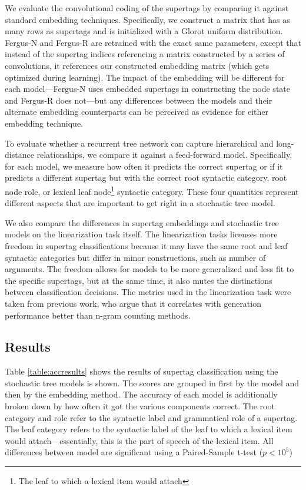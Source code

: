\documentclass[11pt]{article}
\begin{document}
We evaluate the convolutional coding of the supertags by comparing it against standard embedding techniques.
%
Specifically, we construct a matrix that has as many rows as supertags and is initialized with a Glorot uniform distribution.
%
Fergus-N and Fergus-R are retrained with the exact same parameters, except that instead of the supertag indices referencing a matrix constructed by a series of convolutions, it references our constructed embedding matrix (which gets optimized during learning). 
%
The impact of the embedding will be different for each model---Fergus-N uses embedded supertags in constructing the node state and Fergus-R does not---but any differences between the models and their alternate embedding counterparts can be perceived as evidence for either embedding technique.  


To evaluate whether a recurrent tree network can capture hierarchical and long-distance relationships, we compare it against a feed-forward model. 
%
Specifically, for each model, we measure how often it predicts the correct supertag or if it predicts a different supertag but with the correct root syntactic category, root node role, or lexical leaf node\footnote{The leaf to which a lexical item would attach} syntactic category.
%
These four quantities represent different aspects that are important to get right in a stochastic tree model.



We also compare the differences in supertag embeddings and stochastic tree models on the linearization task itself.
%
The linearization tasks licenses more freedom in supertag classifications because it may have the same root and leaf syntactic categories but differ in minor constructions, such as number of arguments. 
%
The freedom allows for models to be more generalized and less fit to the specific supertags, but at the same time, it also mutes the distinctions between classification decisions.
%
The metrics used in the linearization task were taken from previous work, who argue that it correlates with generation performance better than n-gram counting methods. 


\subsection{Results}

Table \ref{table:accresults} shows the results of supertag classification using the stochastic tree models is shown. 
%
The scores are grouped in first by the model and then by the embedding method. 
%
The accuracy of each model is additionally broken down by how often it got the various components correct. 
%
The root category and role refer to the syntactic label and grammatical role of a supertag. 
%
The leaf category refers to the syntactic label of the leaf to which a lexical item would attach---essentially, this is the part of speech of the lexical item.
%
All differences between model are significant using a Paired-Sample t-test ($p<10^{5}$)
\end{document}
